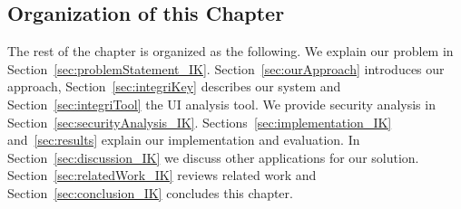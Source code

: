 \subsection{Organization of this Chapter} The rest of the chapter is organized as the following. We explain our problem in Section~\ref{sec:problemStatement_IK}. Section~\ref{sec:ourApproach} introduces our approach, Section~\ref{sec:integriKey} describes our system and Section~\ref{sec:integriTool} the UI analysis tool. We provide security analysis in Section~\ref{sec:securityAnalysis_IK}. Sections~\ref{sec:implementation_IK} and~\ref{sec:results} explain our implementation and evaluation. In Section~\ref{sec:discussion_IK} we discuss other applications for our solution. Section~\ref{sec:relatedWork_IK} reviews related work and Section~\ref{sec:conclusion_IK} concludes this chapter.



